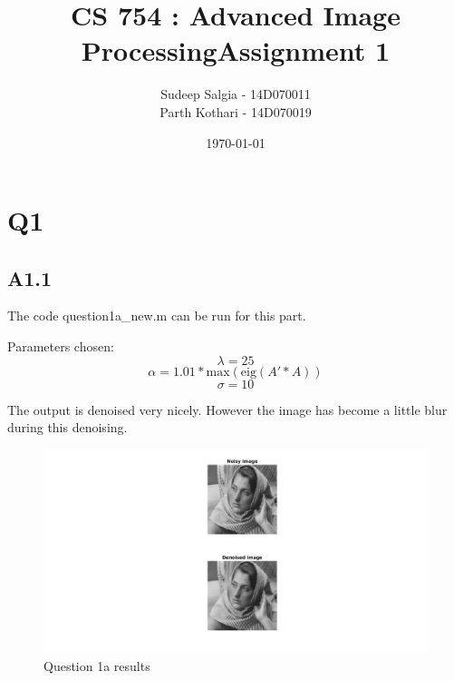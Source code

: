 \documentclass{article}
\title{CS 754 : Advanced Image ProcessingAssignment 1}
\author{Sudeep Salgia - 14D070011\\
  Parth Kothari - 14D070019\\
}
\date{\today}
\begin{document}
\maketitle

\section*{Q1}
\subsection*{A1.1}

The code question1a\_new.m can be run for this part.

Parameters chosen:
$$\lambda = 25$$
$$\alpha = 1.01*\text{max}(\text{eig}(A'*A))$$
$$\sigma = 10$$

The output is denoised very nicely. However the image has become a little blur during this denoising.

\begin{figure}[h]
	\centering
	\includegraphics[scale=0.5]{q1a.jpg}
	\caption{Question 1a results}
	\label{Fig :1a}
\end{figure}

\end{document}
